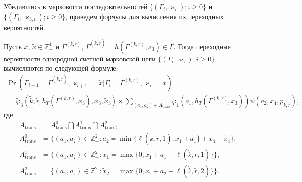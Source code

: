 \documentclass[a4paper,12pt,russian]{extarticle}
\newcommand{\ga}[1]{\Gamma^{\left( #1 \right)} }
\newcommand{\Mark}{\{(\Gamma_i, \varkappa_i); i \geqslant 0\}}
\newcommand{\MarkThree}{\{(\Gamma_i, \varkappa_{3,i}); i \geqslant 0\}}
\begin{document}
Убедившись в марковости последовательностей $\Mark$ и $\MarkThree$, приведем формулы для вычисления их переходных вероятностей. 
\begin{theorem}
Пусть $x$, $\tilde{x}\in \mathbb{Z}_+^4$ и $\ga{k,r}$, $\ga{\tilde{k},\tilde{r}}=h(\ga{k,r},x_3) \in \Gamma$. Тогда переходные вероятности однородной счетной марковской цепи $\Mark$ вычисляются по следующей формуле:
\begin{multline}
\Pr (\Gamma_{i+1}=\ga{\tilde{k},\tilde{r}},\varkappa_{i+1}=\tilde{x} | \Gamma_{i}=\ga{k,r},\varkappa_i=x)=\\ 
=\widetilde{\varphi}_3(\tilde{k},\tilde{r},h_T(\ga{{k},{r}},x_3),x_3,\tilde{x}_3)\times
\sum_{(a_1,a_2)\in A_{\mathrm{trans}}}\varphi_1(a_1,h_T(\ga{{k},{r}},x_3))  \psi(a_2,x_4, p_{\tilde{k},\tilde{r}}),
\label{transitionToProve}
\end{multline}
где 
\begin{align*}
A_{\mathrm{trans}} &= A_{\mathrm{trans}}^0 \bigcap A_{\mathrm{trans}}^1\bigcap A_{\mathrm{trans}}^2,\\
A_{\mathrm{trans}}^0 &= \{(a_1,a_2) \in \mathbb{Z}_+^2 \colon a_2 = \min{\{\ell(\tilde{k},\tilde{r},1), x_1+a_1}\} +x_4-\tilde{x}_4\},\\
A_{\mathrm{trans}}^1 &= \{(a_1,a_2) \in \mathbb{Z}_+^2 \colon \tilde{x}_1=\max{\{0,x_1+a_1-\ell(\tilde{k},\tilde{r},1)\}}\},\\
A_{\mathrm{trans}}^2 &= \{(a_1,a_2) \in \mathbb{Z}_+^2 \colon  \tilde{x}_2=\max{\{0,x_2+a_2-\ell(\tilde{k},\tilde{r},2)\}}\}.
\end{align*}
\end{theorem}
\end{document}
